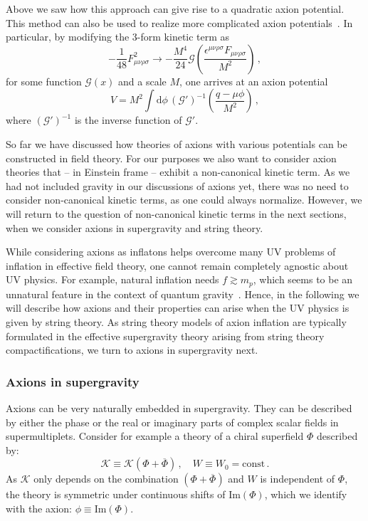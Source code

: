 Above we saw how this approach can give rise to a quadratic axion potential. This method can also be used to realize more complicated axion potentials~\cite{0507215}. In particular, by modifying the 3-form kinetic term as
\begin{equation}
- \frac{1}{48} F_{\mu \nu \rho \sigma}^2 \rightarrow -\frac{M^4}{24} \mathcal{G} \left(\frac{\epsilon^{\mu \nu \rho \sigma}F_{\mu \nu \rho \sigma}}{M^2} \right) \, ,
\end{equation}
for some function $\mathcal{G}(x)$ and a scale $M$, one arrives at an axion potential
\begin{equation}
V = M^2 \int \textrm{d} \phi \, (\mathcal{G}')^{-1}\left(\frac{q-\mu \phi}{M^2} \right) \, ,
\end{equation}
where $(\mathcal{G}')^{-1}$ is the inverse function of $\mathcal{G}'$.

So far we have discussed how theories of axions with various potentials can be constructed in field theory. For our purposes we also want to consider axion theories that -- in Einstein frame -- exhibit a non-canonical kinetic term. As we had not included gravity in our discussions of axions yet, there was no need to consider non-canonical kinetic terms, as one could always normalize. However, we will return to the question of non-canonical kinetic terms in the next sections, when we consider axions in supergravity and string theory. 

While considering axions as inflatons helps overcome many UV problems of inflation in effective field theory, one cannot remain completely agnostic about UV physics. For example, natural inflation needs $f \gtrsim m_p$, which seems to be an unnatural feature in the context of quantum gravity~\cite{ArkaniHamed:2006dz, 0605206, Conlon:2012tz}. Hence, in the following we will describe how axions and their properties can arise when the UV physics is given by string theory. As string theory models of axion inflation are typically formulated in the effective supergravity theory arising from string theory compactifications, we turn to axions in supergravity next.

\subsubsection*{Axions in supergravity}
Axions can be very naturally embedded in supergravity. They can be described by either the phase or the real or imaginary parts of complex scalar fields in supermultiplets. Consider for example a theory of a chiral superfield $\Phi$ described by:
\begin{equation}
\mathcal{K} \equiv \mathcal{K}\left(\Phi + \overline{\Phi}\right)\,, \quad W \equiv W_0 = \textrm{const} \, .
\end{equation}
As $\mathcal{K}$ only depends on the combination $(\Phi + \overline{\Phi})$ and $W$ is independent of $\Phi$, the theory is symmetric under continuous shifts of $\textrm{Im}(\Phi)$, which we identify with the axion: $\phi \equiv \textrm{Im}(\Phi)$. 

